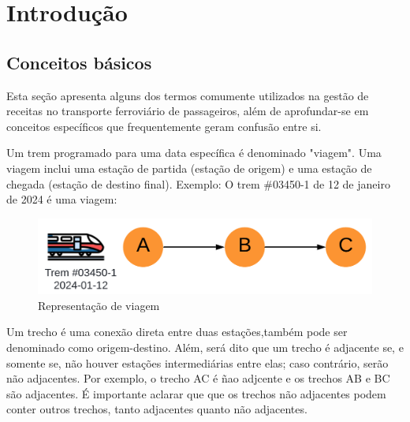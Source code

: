 \chapter{Introdução}

\section{Conceitos básicos}
Esta seção apresenta alguns dos termos comumente utilizados na gestão de receitas no transporte ferroviário de passageiros, além de aprofundar-se em conceitos específicos que frequentemente geram confusão entre si.

\begin{description}[style=unboxed, leftmargin=0cm]

	\item[Viagem:] Um trem programado para uma data específica é denominado "viagem". Uma viagem inclui uma estação de partida (estação de origem) e uma estação de chegada (estação de destino final). Exemplo: O trem \#03450-1 de 12 de janeiro de 2024 é uma viagem:

	      \begin{figure}[H]
		      \begin{center}
			      \includegraphics[scale=0.12]{img/viagem.png}
			      \caption{Representação de viagem}
			      \label{fig: viagem}
		      \end{center}
	      \end{figure}
	      \vspace{-1cm}

	\item[Trecho:] Um trecho é uma conexão direta entre duas estações,também pode ser denominado como origem-destino. Além, será dito que um trecho é adjacente se, e somente se, não houver estações intermediárias entre elas; caso contrário, serão não adjacentes. Por exemplo, o trecho AC é ñao adjcente e os trechos AB e BC são adjacentes. É importante aclarar que que os trechos não adjacentes podem conter outros trechos, tanto adjacentes quanto não adjacentes.


\end{description}
